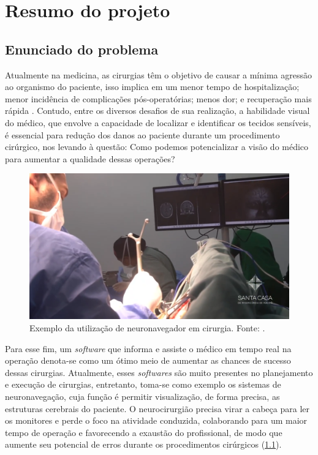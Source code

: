 \chapter{Resumo do projeto}\label{chp:resultadosEsparados}

\section{Enunciado do problema}

Atualmente na medicina, as cirurgias têm o objetivo de causar a mínima agressão ao organismo do paciente, isso implica em um menor tempo de hospitalização; menor incidência de complicações pós-operatórias; menos dor; e recuperação mais rápida \cite{MinInv}. Contudo, entre os diversos desafios de sua realização, a habilidade visual do médico, que envolve a capacidade de localizar e identificar os tecidos sensíveis, é essencial para redução dos danos ao paciente durante um procedimento cirúrgico, nos levando à questão: Como podemos potencializar a visão do médico para aumentar a qualidade dessas operações? 

\begin{figure}[h]
    \centering
    \includegraphics[width=.55\linewidth]{figuras/enunciado.png}
    \caption{Exemplo da utilização de neuronavegador em cirurgia. Fonte: \cite{santacasa}.}
    \label{fig:enunciado}
\end{figure}

Para esse fim, um \textit{software} que informa e assiste o médico em tempo real na operação denota-se como um ótimo meio de aumentar as chances de sucesso dessas cirurgias. Atualmente, esses \textit{softwares} são muito presentes no planejamento e execução de cirurgias, entretanto, toma-se como exemplo os sistemas de neuronavegação, cuja função é permitir visualização, de forma precisa, as estruturas cerebrais do paciente. O neurocirurgião precisa virar a cabeça para ler os monitores e perde o foco na atividade conduzida, colaborando para um maior tempo de operação e favorecendo a exaustão do profissional, de modo que aumente seu potencial de erros durante os procedimentos cirúrgicos (\ref{fig:enunciado}). 

